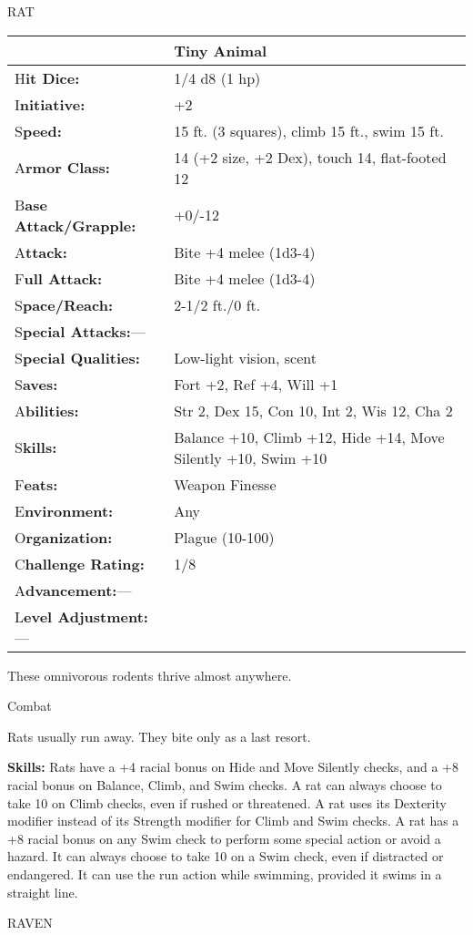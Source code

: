 \documentclass{article}
\begin{document}
\vspace{12pt}
RAT

\begin{tabular}{|>{\raggedright}p{91pt}|>{\raggedright}p{204pt}|}
\hline
  & Tiny Animal\tabularnewline
\hline
H\textbf{it Dice:} & 1/4 d8 (1 hp)\tabularnewline
\hline
I\textbf{nitiative:} & +2\tabularnewline
\hline
S\textbf{peed:} & 15 ft. (3 squares), climb 15 ft., swim 15 ft.\tabularnewline
\hline
A\textbf{rmor Class:} & 14 (+2 size, +2 Dex), touch 14, flat-footed 12\tabularnewline
\hline
B\textbf{ase Attack/Grapple:} & +0/-12\tabularnewline
\hline
A\textbf{ttack:} & Bite +4 melee (1d3-4)\tabularnewline
\hline
F\textbf{ull Attack:} & Bite +4 melee (1d3-4)\tabularnewline
\hline
S\textbf{pace/Reach:} & 2-1/2 ft./0 ft.\tabularnewline
\hline
S\textbf{pecial Attacks:}--- & \tabularnewline
\hline
S\textbf{pecial Qualities:} & Low-light vision, scent\tabularnewline
\hline
S\textbf{aves:} & Fort +2, Ref +4, Will +1\tabularnewline
\hline
A\textbf{bilities:} & Str 2, Dex 15, Con 10, Int 2, Wis 12, Cha 2\tabularnewline
\hline
S\textbf{kills:} & Balance +10, Climb +12, Hide +14, Move Silently +10, Swim +10\tabularnewline
\hline
F\textbf{eats:} & Weapon Finesse\tabularnewline
\hline
E\textbf{nvironment:} & Any\tabularnewline
\hline
O\textbf{rganization:} & Plague (10-100)\tabularnewline
\hline
C\textbf{hallenge Rating:} & 1/8\tabularnewline
\hline
A\textbf{dvancement:}--- & \tabularnewline
\hline
L\textbf{evel Adjustment:}--- & \tabularnewline
\hline
\end{tabular}

These omnivorous rodents thrive almost anywhere.

Combat

Rats usually run away. They bite only as a last resort.

\textbf{Skills:} Rats have a +4 racial bonus on Hide and Move Silently checks, 
and a +8 racial bonus on Balance, Climb, and Swim checks. A rat can always choose 
to take 10 on Climb checks, even if rushed or threatened. A rat uses its Dexterity 
modifier instead of its Strength modifier for Climb and Swim checks. A rat has 
a +8 racial bonus on any Swim check to perform some special action or avoid a hazard. 
It can always choose to take 10 on a Swim check, even if distracted or endangered. 
It can use the run action while swimming, provided it swims in a straight line.

\vspace{12pt}
RAVEN
\end{document}
